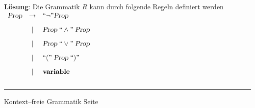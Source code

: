 \begin{slide}{}
\textbf{L\"osung}: Die Grammatik $R$ kann durch folgende Regeln definiert werden \\[0.8cm]
\hspace*{3.3cm} $
\begin{array}{lcl}
    \textsl{Prop} & \rightarrow & ``\neg\cq \textsl{Prop} \\[0.3cm]
                  & |           & \textsl{Prop}\; ``\wedge\cq \;\textsl{Prop} \\[0.3cm]
                  & |           & \textsl{Prop}\; ``\vee\cq \;\textsl{Prop} \\[0.3cm]
                  & |           & ``\mathtt{(}\cq\; \textsl{Prop}\; ``\mathtt{)}\cq  \\[0.3cm]
                  & |           & \mathbf{variable}  \\[0.3cm]
\end{array}
$


\vspace*{\fill}
\tiny \addtocounter{mypage}{1}
\rule{17cm}{1mm}
Kontext--freie Grammatik  \hspace*{\fill} Seite 
\end{slide}








